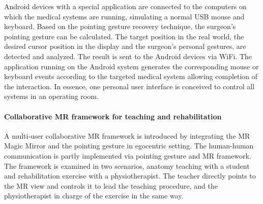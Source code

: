 Android devices with a special application are connected to the computers on which the medical systems are running, simulating a normal USB mouse and keyboard. 
Based on the pointing gesture recovery technique, the surgeon's pointing gesture can be calculated. The target position in the real world, the desired cursor position in the display and the surgeon's personal gestures, are detected and analyzed. The result is sent to the Android devices via WiFi. The application running on the Android system generates the corresponding mouse or keyboard events according to the targeted medical system allowing completion of the interaction. In essence, one personal user interface is conceived to control all systems in an operating room.

\paragraph{Collaborative MR framework for teaching and rehabilitation}
A multi-user collaborative MR framework is introduced by integrating the MR Magic Mirror and the pointing gesture in egocentric setting.
The human-human communication is partly implemented via pointing gesture and MR framework. %
The framework is examined in two scenarios, anatomy teaching with a student and rehabilitation exercise with a physiotherapist. The teacher directly points to the MR view and controls it to lead the teaching procedure, and the physiotherapist in charge of the exercise in the same way.


